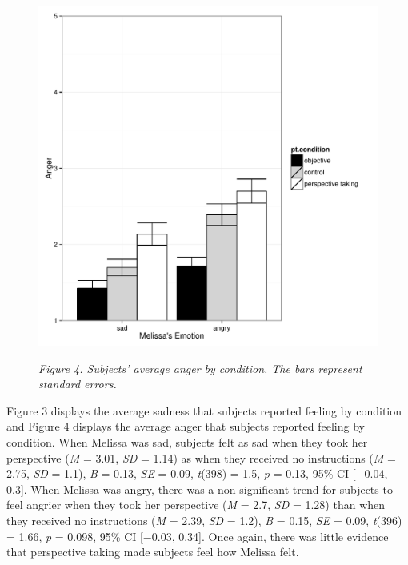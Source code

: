 \documentclass[man,a4paper,noextraspace,apacite]{apa6}\usepackage[]{graphicx}\usepackage[]{color}
\makeatletter
\def\maxwidth{ %
  \ifdim\Gin@nat@width>\linewidth
    \linewidth
  \else
    \Gin@nat@width
  \fi
}
\newenvironment{knitrout}{}{} %
\makeatother
\begin{document}
\begin{figure}
\begin{knitrout}
\color{fgcolor}
\includegraphics[width=\maxwidth]{figure/Figure4Angry-1} 

\end{knitrout}
\textit{Figure 4. Subjects' average anger by condition. The bars represent standard errors.}
\end{figure}



Figure 3 displays the average sadness that subjects reported feeling by condition and Figure 4 displays the average anger that subjects reported feeling by condition. When Melissa was sad, subjects felt as sad when they took her perspective (\textit{M} = 3.01, \textit{SD} = 1.14) as when they received no instructions (\textit{M} = 2.75, \textit{SD} = 1.1), \textit{B} = 0.13, \textit{SE} = 0.09, \textit{t}(398) = 1.5, \textit{p} = 0.13, 95\% CI [\ensuremath{-0.04}, 0.3]. When Melissa was angry, there was a non-significant trend for subjects to feel angrier when they took her perspective (\textit{M} = 2.7, \textit{SD} = 1.28) than when they received no instructions (\textit{M} = 2.39, \textit{SD} = 1.2), \textit{B} = 0.15, \textit{SE} = 0.09, \textit{t}(396) = 1.66, \textit{p} = 0.098, 95\% CI [\ensuremath{-0.03}, 0.34]. Once again, there was little evidence that perspective taking made subjects feel how Melissa felt.
\end{document}
